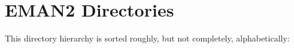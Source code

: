 \section{EMAN2 Directories}
This directory hierarchy is sorted roughly, but not completely, alphabetically:\begin{CompactList}
\item {}
\item {}
\begin{CompactList}
\item {}
\end{CompactList}
\item {}
\item {}
\end{CompactList}
